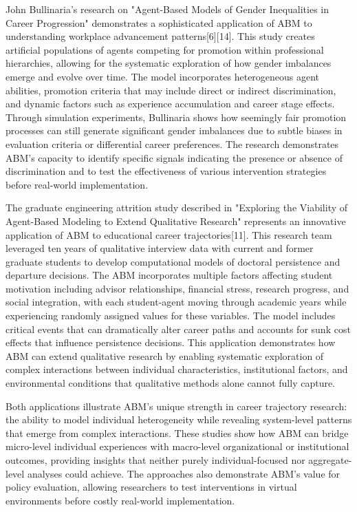 \documentclass[main.tex]{subfiles}
\begin{document}
John Bullinaria's research on "Agent-Based Models of Gender Inequalities in Career Progression" demonstrates a sophisticated application of ABM to understanding workplace advancement patterns[6][14]. This study creates artificial populations of agents competing for promotion within professional hierarchies, allowing for the systematic exploration of how gender imbalances emerge and evolve over time. The model incorporates heterogeneous agent abilities, promotion criteria that may include direct or indirect discrimination, and dynamic factors such as experience accumulation and career stage effects. Through simulation experiments, Bullinaria shows how seemingly fair promotion processes can still generate significant gender imbalances due to subtle biases in evaluation criteria or differential career preferences. The research demonstrates ABM's capacity to identify specific signals indicating the presence or absence of discrimination and to test the effectiveness of various intervention strategies before real-world implementation.

The graduate engineering attrition study described in "Exploring the Viability of Agent-Based Modeling to Extend Qualitative Research" represents an innovative application of ABM to educational career trajectories[11]. This research team leveraged ten years of qualitative interview data with current and former graduate students to develop computational models of doctoral persistence and departure decisions. The ABM incorporates multiple factors affecting student motivation including advisor relationships, financial stress, research progress, and social integration, with each student-agent moving through academic years while experiencing randomly assigned values for these variables. The model includes critical events that can dramatically alter career paths and accounts for sunk cost effects that influence persistence decisions. This application demonstrates how ABM can extend qualitative research by enabling systematic exploration of complex interactions between individual characteristics, institutional factors, and environmental conditions that qualitative methods alone cannot fully capture.

Both applications illustrate ABM's unique strength in career trajectory research: the ability to model individual heterogeneity while revealing system-level patterns that emerge from complex interactions. These studies show how ABM can bridge micro-level individual experiences with macro-level organizational or institutional outcomes, providing insights that neither purely individual-focused nor aggregate-level analyses could achieve. The approaches also demonstrate ABM's value for policy evaluation, allowing researchers to test interventions in virtual environments before costly real-world implementation.
\end{document}
